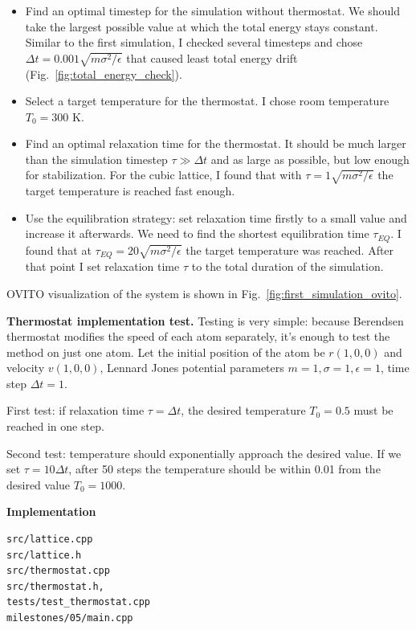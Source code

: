 \documentclass[12pt,a4paper]{article}
\begin{document}
\begin{itemize}
	\item Find an optimal timestep for the simulation without thermostat. We should take the largest possible value at which the total energy stays constant. Similar to the first simulation, I checked several timesteps and chose $\Delta t = 0.001 \sqrt{m\sigma^2 / \epsilon}$ that caused least total energy drift (Fig.~\ref{fig:total_energy_check}).
	\item Select a target temperature for the thermostat. I chose room temperature $T_0 = 300$ K.
	\item Find an optimal relaxation time for the thermostat. It should be much larger than the simulation timestep $\tau \gg \Delta t$ and as large as possible, but low enough for stabilization. For the cubic lattice, I found that with $\tau = 1 \sqrt{m\sigma^2 / \epsilon}$ the target temperature is reached fast enough.
	\item Use the equilibration strategy: set relaxation time firstly to a small value and increase it afterwards. We need to find the shortest equilibration time $\tau_{EQ}$. I found that at $\tau_{EQ} = 20 \sqrt{m\sigma^2 / \epsilon}$ the target temperature was reached. After that point I set relaxation time $\tau$ to the total duration of the simulation.
\end{itemize}

OVITO visualization of the system is shown in Fig.~\ref{fig:first_simulation_ovito}.

{\bf Thermostat implementation test.} Testing is very simple: because Berendsen thermostat modifies the speed of each atom separately, it's enough to test the method on just one atom. Let the initial position of the atom be $r(1, 0, 0)$ and velocity $v(1, 0, 0)$, Lennard Jones potential parameters $m=1, \sigma=1, \epsilon=1$, time step $\Delta t=1$.

First test: if relaxation time $\tau = \Delta t$, the desired temperature $T_0 = 0.5$ must be reached in one step.

Second test: temperature should exponentially approach the desired value. If we set $\tau = 10 \Delta t$, after 50 steps the temperature should be within 0.01 from the desired value $T_0 = 1000$. 


{\bf Implementation}
\begin{lstlisting}[breaklines]
src/lattice.cpp
src/lattice.h
src/thermostat.cpp
src/thermostat.h,
tests/test_thermostat.cpp
milestones/05/main.cpp
\end{lstlisting}
\end{document}
